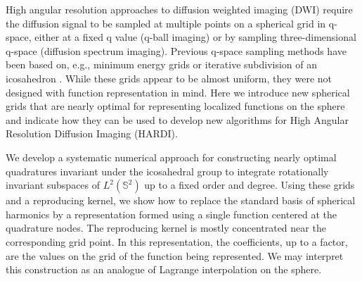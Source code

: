 \documentclass[landscape,a0b,final]{a0poster}
\newenvironment{poster}{
  \begin{center}
  \begin{minipage}[c]{0.98\textwidth}
}{
  \end{minipage} 
  \end{center}
}
\newcommand{\pbox}[4]{
\psshadowbox[#3]{
\begin{minipage}[t][#2][t]{#1}
#4
\end{minipage}
}}
\begin{document}
\begin{poster}
\begin{multicols}{3}
\begin{center}\pbox{0.8\columnwidth}{}{linewidth=2mm,framearc=0.1,linecolor=lightblue,fillstyle=gradient,gradangle=0,gradbegin=white,gradend=whiteblue,gradmidpoint=1.0,framesep=1em}{\begin{center}Introduction\end{center}}\end{center}

High angular resolution approaches to diffusion weighted imaging (DWI) require
the diffusion signal to be sampled at multiple points on a spherical grid in
q-space, either at a fixed q value (q-ball imaging) or by sampling
three-dimensional q-space (diffusion spectrum imaging). Previous q-space
sampling methods have been based on, e.g., minimum energy grids or iterative
subdivision of an icosahedron \cite{TUCH-2004}. While these grids appear to be
almost uniform, they were not designed with function representation in
mind. Here we introduce new spherical grids that are nearly optimal for
representing localized functions on the sphere and indicate how they can be
used to develop new algorithms for High Angular Resolution Diffusion Imaging
(HARDI).

We develop a systematic numerical approach for constructing
nearly optimal quadratures invariant under the icosahedral group to
integrate rotationally invariant subspaces of $L^{2}\left(\mathbb{S}^{2}\right)$
up to a fixed order and degree. Using these grids and a reproducing
kernel, we show how to replace the standard basis of spherical harmonics
by a representation formed using a single function centered at the
quadrature nodes. The reproducing kernel is mostly concentrated near 
the corresponding grid point. In this representation, the 
coefficients, up to a factor, are the values on the grid of the function 
being represented. We may interpret this construction as an analogue of 
Lagrange interpolation on the sphere. 


\begin{center}\pbox{0.8\columnwidth}{}{linewidth=2mm,framearc=0.1,linecolor=lightblue,fillstyle=gradient,gradangle=0,gradbegin=white,gradend=whiteblue,gradmidpoint=1.0,framesep=1em}{\begin{center}Preliminaries\end{center}}\end{center}


\end{multicols}
\end{poster}
\end{document}
